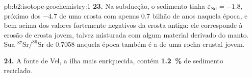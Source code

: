 \begin{solution}{pb:b2:isotope-geochemistry:1}
\textbf{23.} Na subducção, o sedimento tinha $\varepsilon_{\mathrm{Nd}} = -1.8$, próximo dos
$-4.7$ de uma crosta com apenas 0.7 bilhão de anos naquela época, e bem acima dos
valores fortemente negativos da crosta antiga: ele corresponde à erosão de crosta jovem, talvez
misturada com algum material derivado do manto. Sua $^{87}\mathrm{Sr}/^{86}\mathrm{Sr}$ de
0.7058 naquela época também é a de uma rocha crustal jovem.

\textbf{24.} A fonte de Vel, a ilha mais enriquecida, contém
\textbf{\qty[text-series-to-math=true]{1.2}{\percent}} de sedimento reciclado.
\end{solution}

